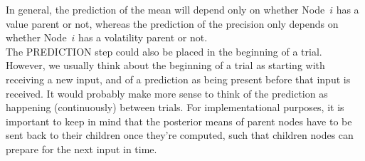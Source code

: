 In general, the prediction of the mean will depend only on whether Node~$i$ has a value parent or not, whereas the prediction of the precision only depends on whether Node~$i$ has a volatility parent or not. \\

The \textsf{PREDICTION step} could also be placed in the beginning of a trial. However, we usually think about the beginning of a trial as starting with receiving a new input, and of a prediction as being present before that input is received. It would probably make more sense to think of the prediction as happening (continuously) between trials. For implementational purposes, it is important to keep in mind that the posterior means of parent nodes have to be sent back to their children once they're computed, such that children nodes can prepare for the next input in time.

